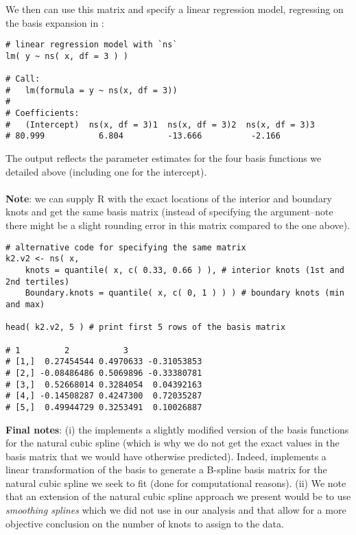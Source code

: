 \documentclass{article}
\begin{document}
\noindent We then can use this matrix and specify a linear regression model, regressing  {} on the basis expansion in  {}:

 \vspace{0.5cm}
 
\begin{lstlisting}
# linear regression model with `ns`
lm( y ~ ns( x, df = 3 ) )

# Call:
#   lm(formula = y ~ ns(x, df = 3))
# 
# Coefficients:
#   (Intercept)  ns(x, df = 3)1  ns(x, df = 3)2  ns(x, df = 3)3  
# 80.999           6.804         -13.666          -2.166  

\end{lstlisting}

 \vspace{0.5cm}
\noindent The output reflects the parameter estimates for the four basis functions we detailed above (including one for the intercept).\\
\\
\noindent \textbf{Note}: we can supply R with the exact locations of the interior and boundary knots and get the same basis matrix (instead of specifying the  {} argument--note there might be a slight rounding error in this matrix compared to the one above).

\vspace{0.5cm}
 
\begin{lstlisting}
# alternative code for specifying the same matrix
k2.v2 <- ns( x, 
    knots = quantile( x, c( 0.33, 0.66 ) ), # interior knots (1st and 2nd tertiles)
    Boundary.knots = quantile( x, c( 0, 1 ) ) ) # boundary knots (min and max)

head( k2.v2, 5 ) # print first 5 rows of the basis matrix

# 1         2           3
# [1,]  0.27454544 0.4970633 -0.31053853
# [2,] -0.08486486 0.5069896 -0.33380781
# [3,]  0.52668014 0.3284054  0.04392163
# [4,] -0.14508287 0.4247300  0.72035287
# [5,]  0.49944729 0.3253491  0.10026887
\end{lstlisting}

\noindent \textbf{Final notes}: (i) the {} implements a slightly modified version of the basis functions for the natural cubic spline (which is why we do not get the exact values in the basis matrix that we would have otherwise predicted). Indeed, {} implements a linear transformation of the basis to generate a B-spline basis matrix for the natural cubic spline we seek to fit (done for computational reasons). (ii) We note that an extension of the natural cubic spline approach we present would be to use \textit{smoothing splines} which we did not use in our analysis and that allow for a more objective conclusion on the number of knots to assign to the data.\supercite{hastie_elements_2009}
\end{document}
